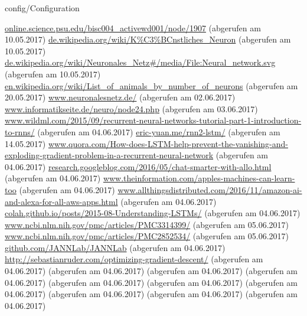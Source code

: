 \documentclass[12pt,headsepline,oneside,ngerman]{scrreprt}
\begin{document}
\graphicspath{{figures/}}

 {config/Configuration}
\pagestyle{headings}




%


%
%
%
%
%


%

\cleardoublepage

\begin{thebibliography}{xxxx}
\url{online.science.psu.edu/bisc004_activewd001/node/1907} (abgerufen am 10.05.2017)
\url{de.wikipedia.org/wiki/K%C3%BCnstliches_Neuron} (abgerufen am 10.05.2017)
\url{de.wikipedia.org/wiki/Neuronales_Netz#/media/File:Neural_network.svg} (abgerufen am 10.05.2017)
\url{en.wikipedia.org/wiki/List_of_animals_by_number_of_neurons} (abgerufen am 20.05.2017)
\url{www.neuronalesnetz.de/} (abgerufen am 02.06.2017)
\url{www.informatikseite.de/neuro/node24.php} (abgerufen am 03.06.2017)
\url{www.wildml.com/2015/09/recurrent-neural-networks-tutorial-part-1-introduction-to-rnns/} (abgerufen am 04.06.2017)
\url{eric-yuan.me/rnn2-lstm/} (abgerufen am 14.05.2017)
\url{www.quora.com/How-does-LSTM-help-prevent-the-vanishing-and-exploding-gradient-problem-in-a-recurrent-neural-network} (abgerufen am 04.06.2017)
\url{research.googleblog.com/2016/05/chat-smarter-with-allo.html} (abgerufen am 04.06.2017)
\url{www.theinformation.com/apples-machines-can-learn-too} (abgerufen am 04.06.2017)
\url{www.allthingsdistributed.com/2016/11/amazon-ai-and-alexa-for-all-aws-apps.html} (abgerufen am 04.06.2017)
\url{colah.github.io/posts/2015-08-Understanding-LSTMs/} (abgerufen am 04.06.2017)
\url{www.ncbi.nlm.nih.gov/pmc/articles/PMC3314399/} (abgerufen am 05.06.2017)
\url{www.ncbi.nlm.nih.gov/pmc/articles/PMC2852534/} (abgerufen am 05.06.2017)
\url{github.com/JANNLab/JANNLab} (abgerufen am 04.06.2017)
\url{http://sebastianruder.com/optimizing-gradient-descent/} (abgerufen am 04.06.2017)
\url{} (abgerufen am 04.06.2017)
\url{} (abgerufen am 04.06.2017)
\url{} (abgerufen am 04.06.2017)
\url{} (abgerufen am 04.06.2017)
\url{} (abgerufen am 04.06.2017)
\url{} (abgerufen am 04.06.2017)
\url{} (abgerufen am 04.06.2017)
\url{} (abgerufen am 04.06.2017)
\url{} (abgerufen am 04.06.2017)



\end{thebibliography}
\renewcommand{\bibname}{Literaturverzeichnis}

%
\end{document}
